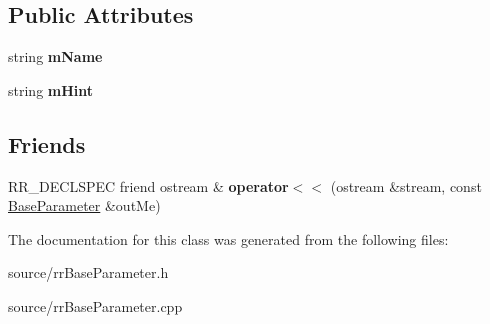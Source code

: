 \subsection*{Public Attributes}
\begin{DoxyCompactItemize}
\item 
\hypertarget{classrr_1_1_base_parameter_a41c362159cf17601e3257fa9d166a484}{string {\bfseries m\-Name}}\label{classrr_1_1_base_parameter_a41c362159cf17601e3257fa9d166a484}

\item 
\hypertarget{classrr_1_1_base_parameter_ad31cd6a4ea318baa26f1b9ed166c5f81}{string {\bfseries m\-Hint}}\label{classrr_1_1_base_parameter_ad31cd6a4ea318baa26f1b9ed166c5f81}

\end{DoxyCompactItemize}
\subsection*{Friends}
\begin{DoxyCompactItemize}
\item 
\hypertarget{classrr_1_1_base_parameter_af0066766ca652906294568e985901d4f}{R\-R\-\_\-\-D\-E\-C\-L\-S\-P\-E\-C friend ostream \& {\bfseries operator$<$$<$} (ostream \&stream, const \hyperlink{classrr_1_1_base_parameter}{Base\-Parameter} \&out\-Me)}\label{classrr_1_1_base_parameter_af0066766ca652906294568e985901d4f}

\end{DoxyCompactItemize}


The documentation for this class was generated from the following files\-:\begin{DoxyCompactItemize}
\item 
source/rr\-Base\-Parameter.\-h\item 
source/rr\-Base\-Parameter.\-cpp\end{DoxyCompactItemize}

